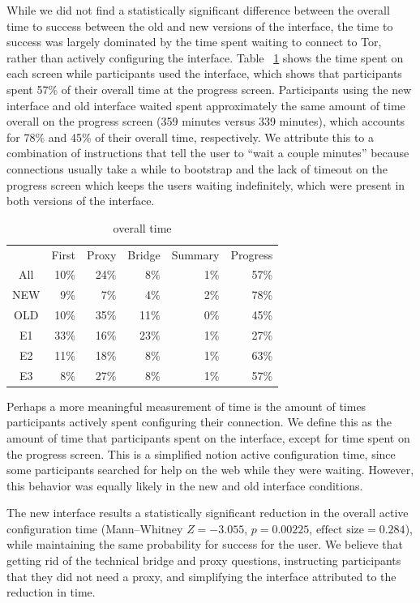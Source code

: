 \documentclass[USenglish,oneside,twocolumn]{article}
\begin{document}
While we did not find a statistically significant difference between the overall time to success between the old and new versions of the interface, the time to success was largely dominated by the time spent waiting to connect to Tor, rather than actively configuring the interface. Table ~\ref{table:overall_time} shows the time spent on each screen while participants used the interface, which shows that participants spent 57\% of their overall time at the progress screen. Participants using the new interface and old interface waited spent approximately the same amount of time overall on the progress screen (359 minutes versus 339 minutes), which accounts for 78\% and 45\% of their overall time, respectively. We attribute this to a combination of instructions that tell the user to ``wait a couple minutes'' because connections usually take a while to bootstrap and the lack of timeout on the progress screen which keeps the users waiting indefinitely, which were present in both versions of the interface. 

\begin{table}
\centering
	\begin{tabular}{c r r r r r}
	 & First & Proxy & Bridge & Summary & Progress \\
	\noalign{\hrule}
	All &  10\% & 24\% & 8\% & 1\% & 57\% \\
	NEW & 9\% & 7\% & 4\% & 2\% &  78\% \\
	OLD & 10\% & 35\% & 11\% & 0\% & 45\% \\
	E1 & 33\% & 16\% & 23\% & 1\% & 27\% \\
	E2 & 11\% & 18\% & 8\% & 1\% & 63\% \\
	E3 & 8\% & 27\% & 8\% & 1\% & 57\% \\
	\end{tabular}
\caption{overall time} 
\label{table:overall_time}
\end{table}

Perhaps a more meaningful measurement of time is the amount of times participants actively spent configuring their connection. We define this as the amount of time that participants spent on the interface, except for time spent on the progress screen. This is a simplified notion active configuration time, since some participants searched for help on the web while they were waiting. However, this behavior was equally likely in the new and old interface conditions.

The new interface results a statistically significant reduction in the overall active configuration time (Mann--Whitney $Z = -3.055$, $p = 0.00225$, $\mbox{effect size} = 0.284$), while maintaining the same probability for success for the user. We believe that getting rid of the technical bridge and proxy questions, instructing participants that they did not need a proxy, and simplifying the interface attributed to the reduction in time. 
\end{document}
